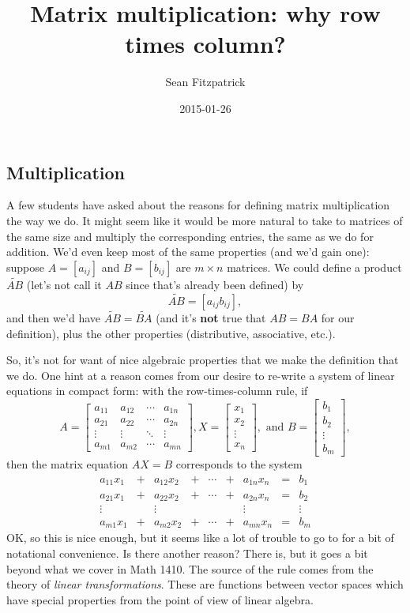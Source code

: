 \documentclass[letterpaper,12pt]{article}
\author{Sean Fitzpatrick}
\date{2015-01-26}
\title{Matrix multiplication: why row times column?}
\begin{document}
\maketitle
\subsection*{Multiplication}
 A few students have asked about the reasons for defining matrix multiplication the way we do. It might seem like it would be more natural to take to matrices of the same size and multiply the corresponding entries, the same as we do for addition. We'd even keep most of the same properties (and we'd gain one): suppose $A=[a_{ij}]$ and $B=[b_{ij}]$ are $m\times n$ matrices. We could define a product $\widetilde{AB}$ (let's not call it $AB$ since that's already been defined) by
\[
 \widetilde{AB} = [a_{ij}b_{ij}],
\]
and then we'd have $\widetilde{AB} = \widetilde{BA}$ (and it's {\bf not} true that $AB=BA$ for our definition), plus the other properties (distributive, associative, etc.).

So, it's not for want of nice algebraic properties that we make the definition that we do. One hint at a reason comes from our desire to re-write a system of linear equations in compact form: with the row-times-column rule, if
\[
 A = \begin{bmatrix}a_{11}&a_{12}&\cdots &a_{1n}\\a_{21}&a_{22}&\cdots &a_{2n}\\\vdots & \vdots & \ddots & \vdots\\a_{m1}&a_{m2}&\cdots &a_{mn}\end{bmatrix}, X = \begin{bmatrix}x_1\\x_2\\\vdots\\x_n\end{bmatrix},\text{ and } B = \begin{bmatrix}b_1\\b_2\\\vdots\\b_m\end{bmatrix},
\]
then the matrix equation $AX=B$ corresponds to the system
\[
 \begin{array}{ccccccccc}
  a_{11}x_1&+&a_{12}x_2&+&\cdots&+&a_{1n}x_n&=&b_1\\
   a_{21}x_1&+&a_{22}x_2&+&\cdots&+&a_{2n}x_n&=&b_2\\
 \vdots & & \vdots & &  & & \vdots & & \vdots\\
 a_{m1}x_1&+&a_{m2}x_2&+&\cdots &+&a_{mn}x_n&=&b_m
 \end{array}
\]
OK, so this is nice enough, but it seems like a lot of trouble to go to for a bit of notational convenience. Is there another reason? There is, but it goes a bit beyond what we cover in Math 1410. The source of the rule comes from the theory of {\em linear transformations}. These are functions between vector spaces which have special properties from the point of view of linear algebra.
\end{document}
